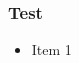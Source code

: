 \documentclass{beamer}
\begin{document}
\begin{frame}
  \frametitle{Test}
  \begin{itemize}
  \item Item 1
  \end{itemize}
\end{frame}
\end{document}
